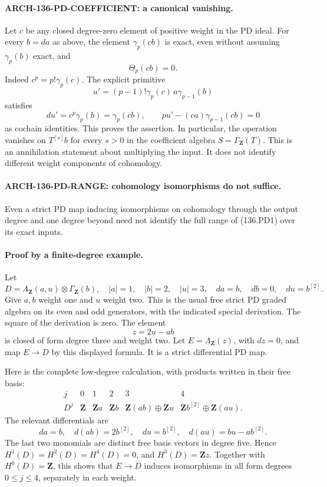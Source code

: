 \paragraph{ARCH-136-PD-COEFFICIENT: a canonical vanishing.}
Let \(c\) be any closed degree-zero element of positive weight in the
PD ideal. For every \(b=da\) as above, the element
\(\gamma_p(cb)\) is exact, even without assuming \(\gamma_p(b)\)
exact, and
\[
                         \Theta_p(cb)=0.
 \tag{136.PD2}
\]
Indeed \(c^p=p!\gamma_p(c)\). The explicit primitive
\[
 u'=(p-1)!\gamma_p(c)\,a\gamma_{p-1}(b)
\]
satisfies
\[
 du'=c^p\gamma_p(b)=\gamma_p(cb),\qquad
 p u'-(ca)\gamma_{p-1}(cb)=0
\]
as cochain identities. This proves the assertion. In particular,
the operation vanishes on \(T^{[s]}b\) for every \(s>0\) in the
coefficient algebra \(S=\Gamma_{\mathbf Z}(T)\). This is an
annihilation statement about multiplying the input. It does not
identify different weight components of cohomology.

\paragraph{ARCH-136-PD-RANGE: cohomology isomorphisms do not suffice.}
Even a strict PD map inducing isomorphisms on cohomology through the
output degree and one degree beyond need not identify the full
range of (136.PD1) over its exact inputs.

\paragraph{Proof by a finite-degree example.}
Let
\[
 D=\Lambda_{\mathbf Z}(a,u)\otimes\Gamma_{\mathbf Z}(b),
 \quad |a|=1,\quad |b|=2,\quad |u|=3,
 \quad da=b,\quad db=0,\quad du=b^{[2]}.
 \tag{136.PD3}
\]
Give \(a,b\) weight one and \(u\) weight two. This is the usual free
strict PD graded algebra on its even and odd generators, with the
indicated special derivation. The square of the derivation is zero.
The element
\[
                         z=2u-ab
\]
is closed of form degree three and weight two. Let
\(E=\Lambda_{\mathbf Z}(z)\), with \(dz=0\), and map \(E\to D\) by
this displayed formula. It is a strict differential PD map.

Here is the complete low-degree calculation, with products written
in their free basis:
\[
\begin{array}{c|ccccc}
 j&0&1&2&3&4\\ \hline
 D^j&\mathbf Z&\mathbf Za&\mathbf Zb&
       \mathbf Z(ab)\oplus\mathbf Zu&
       \mathbf Zb^{[2]}\oplus\mathbf Z(au).
\end{array}
\]
The relevant differentials are
\[
 da=b,\quad d(ab)=2b^{[2]},\quad du=b^{[2]},\quad
 d(au)=bu-ab^{[2]}.
\]
The last two monomials are distinct free basis vectors in degree
five. Hence \(H^1(D)=H^2(D)=H^4(D)=0\), and
\(H^3(D)=\mathbf Zz\). Together with \(H^0(D)=\mathbf Z\), this
shows that \(E\to D\) induces isomorphisms in all form degrees
\(0\leq j\leq4\), separately in each weight.

